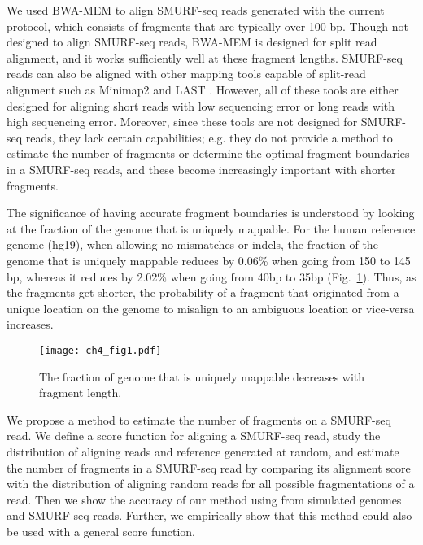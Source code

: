 We used BWA-MEM \cite{li2013aligning} to align SMURF-seq reads generated
with the current protocol, which consists of fragments that are
typically over 100 bp. Though not designed to align SMURF-seq reads,
BWA-MEM is designed for split read alignment, and it works sufficiently
well at these fragment lengths.  SMURF-seq reads can also be aligned
with other mapping tools capable of split-read alignment such as
Minimap2 \cite{li2018minimap2} and LAST \cite{kielbasa2011adaptive}.
However, all of these tools are either designed for aligning short reads
with low sequencing error or long reads with high sequencing error.
%
Moreover, since these tools are not designed for SMURF-seq reads, they
lack certain capabilities; e.g. they do not provide a method to estimate
the number of fragments or determine the optimal fragment boundaries in
a SMURF-seq reads, and these become increasingly important with shorter
fragments.

The significance of having accurate fragment boundaries is understood by
looking at the fraction of the genome that is uniquely mappable. For the
human reference genome (hg19), when allowing no mismatches or indels,
the fraction of the genome that is uniquely mappable reduces by 0.06\%
when going from 150 to 145 bp, whereas it reduces by 2.02\% when going
from 40bp to 35bp (Fig.~\ref{dzones}). Thus, as the fragments get
shorter, the probability of a fragment that originated from a unique
location on the genome to misalign to an ambiguous location or
vice-versa increases.

\begin{figure}[t!]
\centering
\texttt{[image: ch4\_fig1.pdf]}
\caption{The fraction of genome that is uniquely mappable decreases with
          fragment length.}
\label{dzones}
\end{figure}

We propose a method to estimate the number of fragments on a SMURF-seq
read. We define a score function for aligning a SMURF-seq read, study
the distribution of aligning reads and reference generated at random,
and estimate the number of fragments in a SMURF-seq read by comparing
its alignment score with the distribution of aligning random reads for
all possible fragmentations of a read. Then we show the accuracy of our
method using from simulated genomes and SMURF-seq reads. Further, we
empirically show that this method could also be used with a general
score function.

